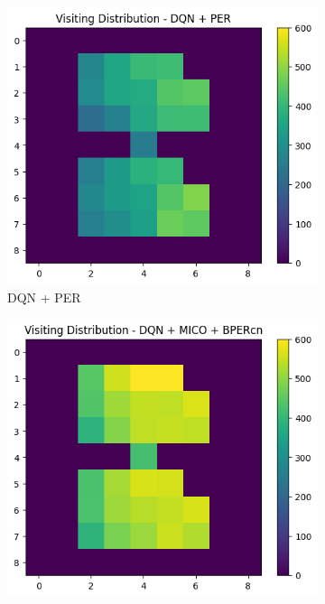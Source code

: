 \begin{figure}[h]
    \hspace*{\fill} %
    \vfill
    \begin{subfigure}{0.32\textwidth}
        \centering
        \includegraphics[width=\linewidth]{Results/grid_world/visitation_distribution_dqn_per.png}
        \caption{DQN + PER}
        \label{fig:visitation_distributions_per}
    \end{subfigure}
    \hfill
    \begin{subfigure}{0.32\textwidth}
        \centering
        \includegraphics[width=\linewidth]{Results/grid_world/visitation_distribution_dqn_mico_bpercn.png}

\end{subfigure}
\end{figure}
